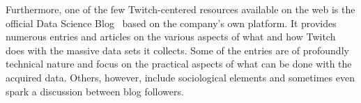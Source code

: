 Furthermore, one of the few Twitch-centered resources available on the web is the official Data Science Blog~\cite{twitch-data-blog} based on the company's own platform. It provides numerous entries and articles on the various aspects of what and how Twitch does with the massive data sets it collects. Some of the entries are of profoundly technical nature and focus on the practical aspects of what can be done with the acquired data. Others, however, include sociological elements and sometimes even spark a discussion between blog followers. 
